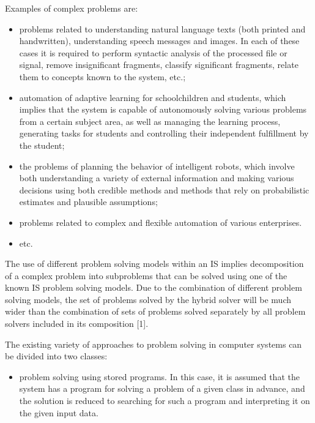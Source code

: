 \documentclass[10pt, a4paper]{article}
\begin{document}
\begin{multicols}{2}
\par Examples of complex problems are:
\vspace{1pt}
\begin{itemize}
    \item problems related to understanding natural language texts (both printed and handwritten), understanding speech messages and images. In each of these cases it is required to perform syntactic analysis of the processed file or signal, remove insignificant fragments, classify significant fragments, relate them to concepts known to the system, etc.;
    \item automation of adaptive learning for schoolchildren and students, which implies that the system is capable of autonomously solving various problems from a certain subject area, as well as managing the learning process, generating tasks for students and controlling their independent fulfillment by the student;
    \item the problems of planning the behavior of intelligent robots, which involve both understanding a variety of external information and making various decisions using both credible methods and methods that rely on probabilistic estimates and plausible assumptions;
    \item problems related to complex and flexible automation of various enterprises.
    \item etc.
\end{itemize}
\vspace{4pt}
\par The use of different problem solving models within an IS implies decomposition of a complex problem into
\newpage
\noindent subproblems that can be solved using one of the known IS problem solving models. Due to the combination of different problem solving models, the set of problems solved by the hybrid solver will be much wider than the combination of sets of problems solved separately by all problem solvers included in its composition [1].
\par The existing variety of approaches to problem solving in computer systems can be divided into two classes:
\begin{itemize}[itemsep=0pt]
\setlength{\baselineskip}{0.87\baselineskip}
    \item
     problem solving using stored programs. In this case,
 it is assumed that the system has a program for
 solving a problem of a given class in advance,
 and the solution is reduced to searching for such a
 program and interpreting it on the given input data.

\end{itemize}
\end{multicols}
\end{document}
